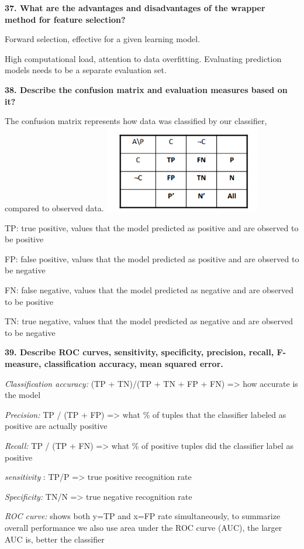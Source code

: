 \textbf{37. What are the advantages and disadvantages of the wrapper
method for feature selection?}

Forward selection, effective for a given learning model.

High computational load, attention to data overfitting. Evaluating
prediction models needs to be a separate evaluation set.

\textbf{38. Describe the confusion matrix and evaluation measures based
on it?}

The confusion matrix represents how data was classified by our
classifier, compared to observed data.
\includegraphics[width=2.69271in,height=1.50359in]{media/image17.png}

TP: true positive, values that the model predicted as positive and are
observed to be positive

FP: false positive, values that the model predicted as positive and are
observed to be negative

FN: false negative, values that the model predicted as negative and are
observed to be positive

TN: true negative, values that the model predicted as negative and are
observed to be negative

\textbf{39. Describe ROC curves, sensitivity, specificity, precision,
recall, F-measure, classification accuracy, mean squared error.}

\textit{Classification accuracy:} (TP + TN)/(TP + TN + FP + FN)
=\textgreater{} how accurate is the model

\textit{Precision:} TP / (TP + FP) =\textgreater{} what \% of tuples
that the classifier labeled as positive are actually positive

\textit{Recall:} TP / (TP + FN) =\textgreater{} what \% of positive
tuples did the classifier label as positive

\textit{sensitivity} : TP/P =\textgreater{} true positive recognition
rate

\textit{Specificity:} TN/N =\textgreater{} true negative recognition
rate

\textit{ROC curve:} shows both y=TP and x=FP rate simultaneously, to
summarize overall performance we also use area under the ROC curve
(AUC), the larger AUC is, better the classifier

